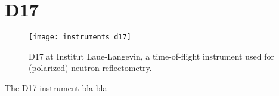\documentclass[\main/dresen_thesis.tex]{subfiles}
\begin{document}
\section{D17}\label{ch:appendix:lss:d17}

\begin{figure}[h]
  \centering
  \texttt{[image: instruments\_d17]}
  \caption{\label{fig:appendix:lss:d17}D17 at Institut Laue-Langevin, a time-of-flight instrument used for (polarized) neutron reflectometry.}
\end{figure}
The D17 instrument bla bla
\end{document}
